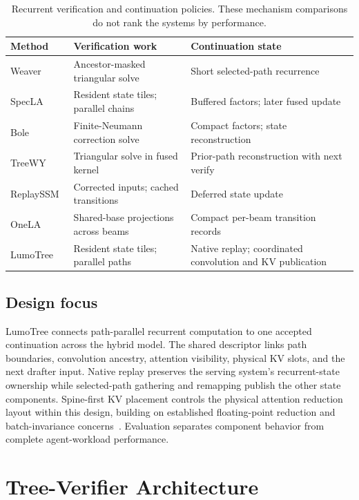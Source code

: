 \documentclass[conference]{IEEEtran}
\newcommand{\sys}{LumoTree}
\begin{document}
\begin{table}[t]
\caption{Recurrent verification and continuation policies. These mechanism comparisons do not rank the systems by performance.}
\label{tab:related}
\centering\footnotesize
\begin{tabularx}{\columnwidth}{@{}>{\raggedright\arraybackslash}p{}YY@{}}
\toprule
Method & Verification work & Continuation state \\
\midrule
Weaver~\cite{oda2026marginals} & Ancestor-masked triangular solve & Short selected-path recurrence \\
SpecLA~\cite{wang2026specla} & Resident state tiles; parallel chains & Buffered factors; later fused update \\
Bole~\cite{wang2026bole} & Finite-Neumann correction solve & Compact factors; state reconstruction \\
TreeWY~\cite{ghantasala2026treewycode} & Triangular solve in fused kernel & Prior-path reconstruction with next verify \\
ReplaySSM~\cite{replayssm2026} & Corrected inputs; cached transitions & Deferred state update \\
OneLA~\cite{yang2026onela} & Shared-base projections across beams & Compact per-beam transition records \\
\sys{} & Resident state tiles; parallel paths & Native replay; coordinated convolution and KV publication \\
\bottomrule
\end{tabularx}
\end{table}

\subsection{Design focus}
\sys{} connects path-parallel recurrent computation to one accepted continuation across the hybrid model. The shared descriptor links path boundaries, convolution ancestry, attention visibility, physical KV slots, and the next drafter input. Native replay preserves the serving system's recurrent-state ownership while selected-path gathering and remapping publish the other state components. Spine-first KV placement controls the physical attention reduction layout within this design, building on established floating-point reduction and batch-invariance concerns~\cite{he2025determinism}. Evaluation separates component behavior from complete agent-workload performance.

\section{Tree-Verifier Architecture}
\label{sec:contract}
\end{document}

